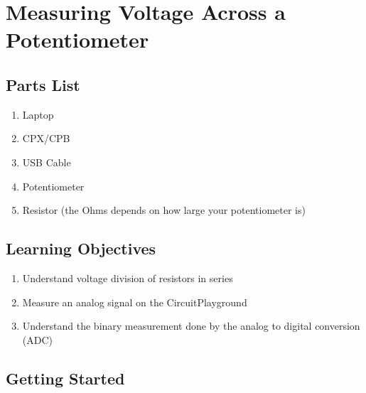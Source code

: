 \section{Measuring Voltage Across a Potentiometer}

\subsection{Parts List}

\begin{enumerate}[itemsep=-5pt]
\item Laptop
\item CPX/CPB
\item USB Cable
\item Potentiometer
\item Resistor (the Ohms depends on how large your potentiometer is)
\end{enumerate}

\subsection{Learning Objectives}
\begin{enumerate}[itemsep=-5pt]
\item Understand voltage division of resistors in series
\item Measure an analog signal on the CircuitPlayground
\item Understand the binary measurement done by the analog to digital conversion (ADC)
\end{enumerate}

\subsection{Getting Started}

